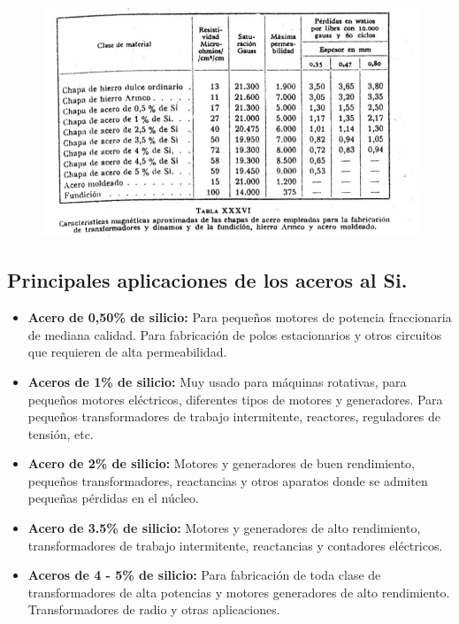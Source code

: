 \documentclass[12pt,a4paper]{article}
\begin{document}
\begin{figure}[H]    
    \centering         
    \includegraphics[width=1\textwidth]{IMAGENES LATEX/6.jpg}
\end{figure}

\subsection{Principales aplicaciones de los aceros al Si.}

\begin{itemize}
    \item \textbf{Acero de 0,50\% de silicio:}
    Para pequeños motores de potencia fraccionaria de mediana calidad. Para fabricación de polos estacionarios y otros circuitos que requieren de alta permeabilidad.
    \item \textbf{Aceros de 1\% de silicio:}
    Muy usado para máquinas rotativas, para pequeños motores eléctricos, diferentes tipos de motores y generadores. Para pequeños transformadores de trabajo intermitente, reactores, reguladores de tensión, etc.
    \item \textbf{Acero de 2\% de silicio:}
    Motores y generadores de buen rendimiento, pequeños transformadores, reactancias y otros aparatos donde se admiten pequeñas pérdidas en el núcleo.
    \item \textbf{Acero de 3.5\% de silicio:}
    Motores y generadores de alto rendimiento, transformadores de trabajo intermitente, reactancias y contadores eléctricos.
    \item \textbf{Aceros de 4 - 5\% de silicio:}
    Para fabricación de toda clase de transformadores de alta potencias y motores generadores de alto rendimiento. Transformadores de radio y otras aplicaciones.
\end{itemize}
\end{document}
